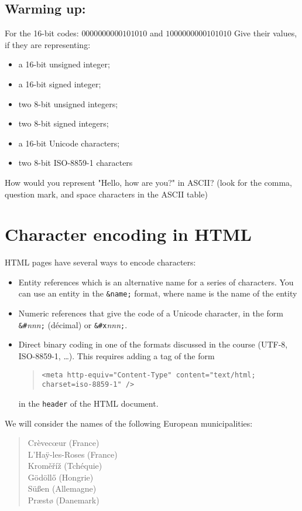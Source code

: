 \documentclass[11pt]{article}
\newcommand{\numtd}{03}
\newcommand{\titretd}{Data Representation}
\begin{document}
	
	\entete{\numtd}{\titretd}


\subsection*{Warming up:}
For the 16-bit codes: $0000 0000 0010 1010$ and $1000 0000 0010 1010$ Give their values, if they are representing:

\begin{itemize}
    \item a 16-bit unsigned integer;
    \item a 16-bit signed integer;
    \item two 8-bit unsigned integers;
    \item two 8-bit signed integers;
    \item a 16-bit Unicode characters;
    \item two 8-bit ISO-8859-1 characters
\end{itemize}

\bigskip

How would you represent "Hello, how are you?" in ASCII? (look for the comma, question mark, and space characters in the ASCII table)


\section{Character encoding in HTML}
HTML pages have several ways to encode characters:
\begin{itemize}
    \item Entity references which is an alternative name for a series of characters. You can use an entity in the \texttt{\&name;} format, where name is the name of the entity
    \item Numeric references that give the code of a Unicode character, in the form 
    \texttt{\&\#}\emph{nnn}\texttt{;} (décimal) or
\texttt{\&\#x}\emph{nnn}\texttt{;}.\smallskip
    \item Direct binary coding in one of the formats discussed in the course (UTF-8, ISO-8859-1, \ldots). This requires adding a tag of the form
    \begin{quote}
  \texttt{<meta http-equiv="Content-Type" content="text/html; charset=iso-8859-1" />}
 \end{quote}
 in the \texttt{header} of the HTML document.
\end{itemize}
We will consider the names of the following European municipalities:
 \begin{quote}
 Crèvec\oe{}ur (France)\\ L'Ha\"y-les-Roses (France)\\ Krom\v{e}\v{r}\'i\v{z}
(Tchéquie)\\ G\"od\"oll\H{o} (Hongrie)\\ S\"u\ss{}en (Allemagne)\\
Pr\ae{}st\o{} (Danemark)
 \end{quote}
\end{document}
